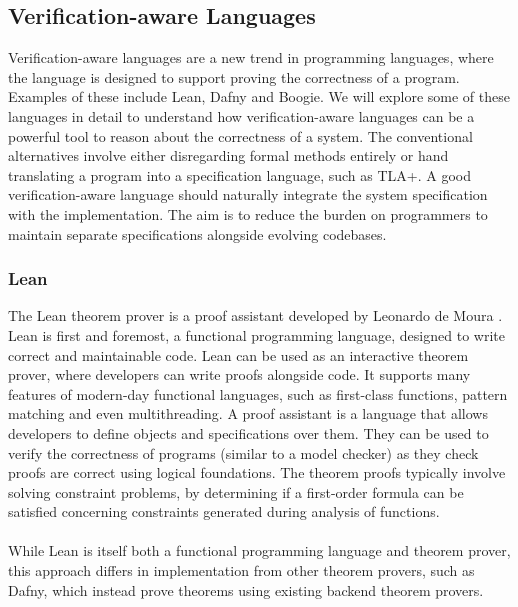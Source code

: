 \subsection{Verification-aware Languages}
Verification-aware languages are a new trend in programming languages, where the language is designed to support proving the correctness of a program. Examples of these include Lean, Dafny and Boogie. We will explore some of these languages in detail to understand how verification-aware languages can be a powerful tool to reason about the correctness of a system. The conventional alternatives involve either disregarding formal methods entirely or hand translating a program into a specification language, such as TLA+. A good verification-aware language should naturally integrate the system specification with the implementation. The aim is to reduce the burden on programmers to maintain separate specifications alongside evolving codebases.
\subsubsection{Lean}
The Lean theorem prover is a proof assistant developed by Leonardo de Moura \cite{lean}. Lean is first and foremost, a functional programming language, designed to write correct and maintainable code. Lean can be used as an interactive theorem prover, where developers can write proofs alongside code. It supports many features of modern-day functional languages, such as first-class functions, pattern matching and even multithreading. A proof assistant is a language that allows developers to define objects and specifications over them. They can be used to verify the correctness of programs (similar to a model checker) as they check proofs are correct using logical foundations. The theorem proofs typically involve solving constraint problems, by determining if a first-order formula can be satisfied concerning constraints generated during analysis of functions.
\\ \\
While Lean is itself both a functional programming language and theorem prover, this approach differs in implementation from other theorem provers, such as Dafny, which instead prove theorems using existing backend theorem provers.

